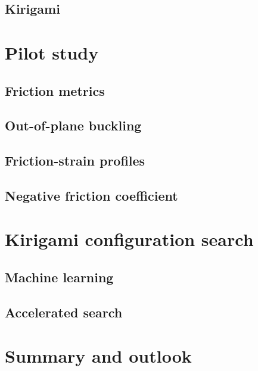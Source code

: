 \documentclass[UKenglish]{beamer}
\begin{document}
\subsection{Kirigami}




\section{Pilot study} %
\subsection{Friction metrics}
\subsection{Out-of-plane buckling}
\subsection{Friction-strain profiles}
\subsection{Negative friction coefficient}


\section{Kirigami configuration search} %
\subsection{Machine learning}
\subsection{Accelerated search}



\section{Summary and outlook} %
\end{document}
